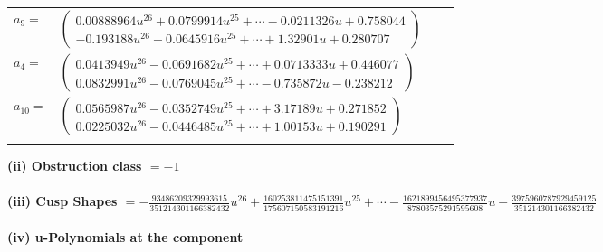 \documentclass[1p]{elsarticle_modified}
\theoremstyle{definition}
\begin{document}
\begin{tabular}{m{7pt} m{180pt} m{7pt} m{180pt} }
\flushright $a_{9}=$&$\begin{pmatrix}0.00888964 u^{26}+0.0799914 u^{25}+\cdots-0.0211326 u+0.758044\\-0.193188 u^{26}+0.0645916 u^{25}+\cdots+1.32901 u+0.280707\end{pmatrix}$ \\
\flushright $a_{4}=$&$\begin{pmatrix}0.0413949 u^{26}-0.0691682 u^{25}+\cdots+0.0713333 u+0.446077\\0.0832991 u^{26}-0.0769045 u^{25}+\cdots-0.735872 u-0.238212\end{pmatrix}$ \\
\flushright $a_{10}=$&$\begin{pmatrix}0.0565987 u^{26}-0.0352749 u^{25}+\cdots+3.17189 u+0.271852\\0.0225032 u^{26}-0.0446485 u^{25}+\cdots+1.00153 u+0.190291\end{pmatrix}$\\&\end{tabular}
\flushleft \textbf{(ii) Obstruction class $= -1$}\\~\\
\flushleft \textbf{(iii) Cusp Shapes $= -\frac{93486209329993615}{351214301166382432} u^{26}+\frac{160253811475151391}{175607150583191216} u^{25}+\cdots-\frac{1621899456495377937}{87803575291595608} u-\frac{3975960787929459125}{351214301166382432}$}\\~\\
\newpage\renewcommand{\arraystretch}{1}
\flushleft \textbf{(iv) u-Polynomials at the component}\newline \\
\end{document}
